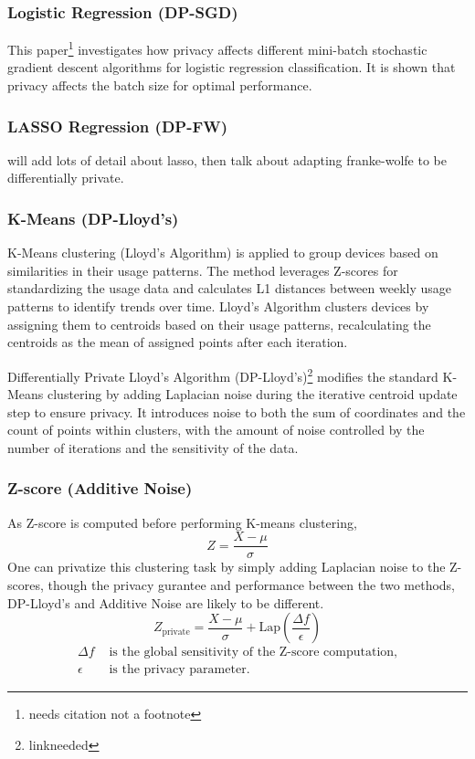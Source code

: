 \documentclass[12pt,letterpaper]{article}
\begin{document}
\subsubsection{Logistic Regression (DP-SGD)}

This paper\footnote{needs citation not a footnote} investigates how privacy affects different mini-batch stochastic gradient descent algorithms for logistic regression classification. It is shown that privacy affects the batch size for optimal performance.

\subsubsection{LASSO Regression (DP-FW)}

will add lots of detail about lasso, then talk about adapting franke-wolfe to be differentially private. 

\subsubsection{K-Means (DP-Lloyd's)}
K-Means clustering (Lloyd's Algorithm) is applied to group devices based on similarities in their usage patterns. The method leverages Z-scores for standardizing the usage data and calculates L1 distances between weekly usage patterns to identify trends over time. Lloyd's Algorithm clusters devices by assigning them to centroids based on their usage patterns, recalculating the centroids as the mean of assigned points after each iteration. 

Differentially Private Lloyd's Algorithm (DP-Lloyd's)\footnote{linkneeded} modifies the standard K-Means clustering by adding Laplacian noise during the iterative centroid update step to ensure privacy. It introduces noise to both the sum of coordinates and the count of points within clusters, with the amount of noise controlled by the number of iterations and the sensitivity of the data. 
\subsubsection{Z-score (Additive Noise)}
As Z-score is computed before performing K-means clustering, 
\[
Z = \frac{X - \mu}{\sigma}
\]
One can privatize this clustering task by simply adding Laplacian noise to the Z-scores, though the privacy gurantee and performance between the two methods, DP-Lloyd's and Additive Noise are likely to be different.
\[
Z_{\text{private}} = \frac{X - \mu}{\sigma} + \text{Lap}\left(\frac{\Delta f}{\epsilon}\right)
\]
\begin{equation*}
\begin{aligned}
    \Delta f & \text{ is the global sensitivity of the Z-score computation,} \\
    \epsilon & \text{ is the privacy parameter.}
\end{aligned}
\end{equation*}
\end{document}
